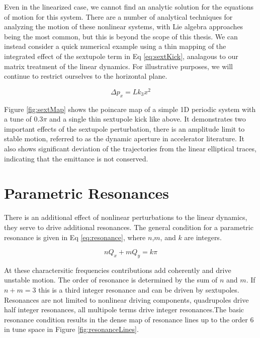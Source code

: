 Even in the linearized case, we cannot find an analytic solution for the equations of motion for this system. There are a number of analytical techniques for analyzing the motion of these nonlinear systems, with Lie algebra approaches being the most common, but this is beyond the scope of this thesis. We can instead consider a quick numerical example using a thin mapping of the integrated effect of the sextupole term in Eq \ref{eq:sextKick}, analagous to our matrix treatment of the linear dynamics. For illustrative purposes, we will continue to restrict ourselves to the horizontal plane.

\begin{equation} \label{eq:sextKick}
	\Delta p_x = Lk_3x^2
\end{equation}

Figure \ref{fig:sextMap} shows the poincare map of a simple 1D periodic system with a tune of 0.3$\pi$ and a single thin sextupole kick like above. It demonstrates two important effects of the sextupole perturbation, there is an amplitude limit to stable motion, referred to as the dynamic aperture in accelerator literature. It also shows significant deviation of the trajectories from the linear elliptical traces, indicating that the emittance is not conserved.

\section{Parametric Resonances} \label{sec:resonances}
There is an additional effect of nonlinear perturbations to the linear dynamics, they serve to drive additional resonances. The general condition for a parametric resonance is given in Eq \ref{eq:resonance}, where $n$,$m$, and $k$ are integers.

\begin{equation} \label{eq:resonance}
	nQ_x + mQ_y = k\pi
\end{equation}

At these charactersitic frequencies contributions add coherently and drive unstable motion. The order of resonance is determined by the sum of $n$ and $m$. If $n + m = 3$ this is a third integer resonance and can be driven by sextupoles. Resonances are not limited to nonlinear driving components, quadrupoles drive half integer resonances, all multipole terms drive integer resonances.The basic resonance condition results in the dense map of resonance lines up to the order 6 in tune space in Figure \ref{fig:resonanceLines}. 

